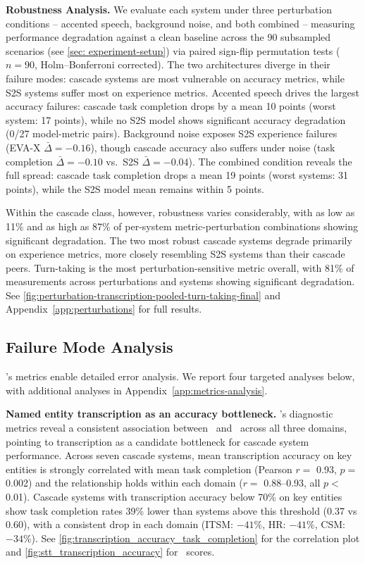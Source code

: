 \textbf{Robustness Analysis.}
We evaluate each system under three perturbation conditions -- accented speech, background noise, and both combined -- measuring performance degradation against a clean baseline across the 90 subsampled scenarios (see \autoref{sec: experiment-setup}) via paired sign-flip permutation tests ($n{=}90$, Holm--Bonferroni corrected). The two architectures diverge in their failure modes: cascade systems are most vulnerable on accuracy metrics, while S2S systems suffer most on experience metrics. Accented speech drives the largest accuracy failures: cascade task completion drops by a mean 10 points (worst system: 17 points), while no S2S model shows significant accuracy degradation (0/27 model-metric pairs). Background noise exposes S2S experience failures (EVA-X $\bar{\Delta}{=}{-}0.16$), though cascade accuracy also suffers under noise (task completion $\bar{\Delta}{=}{-}0.10$ vs.\ S2S $\bar{\Delta}{=}{-}0.04$). The combined condition reveals the full spread: cascade task completion drops a mean 19 points (worst systems: 31 points), while the S2S model mean remains within 5 points. 

Within the cascade class, however, robustness varies considerably, with as low as 11\% and as high as 87\% of per-system metric-perturbation combinations showing significant degradation. The two most robust cascade systems degrade primarily on experience metrics, more closely resembling S2S systems than their cascade peers. Turn-taking is the most perturbation-sensitive metric overall, with 81\% of measurements across perturbations and systems showing significant degradation. See \autoref{fig:perturbation-transcription-pooled-turn-taking-final} and Appendix~\ref{app:perturbations} for full results.

\subsection{Failure Mode Analysis}
\label{sec:failure-modes}
\framework's metrics enable detailed error analysis. We report four targeted analyses below, with additional analyses in Appendix~\ref{app:metrics-analysis}.



\textbf{Named entity transcription as an accuracy bottleneck.}
\framework's diagnostic metrics reveal a consistent association between \metrictranscription~and \metrictaskcompletion~across all three domains, pointing to transcription as a candidate bottleneck for cascade system performance. Across seven cascade systems, mean transcription accuracy on key entities is strongly correlated with mean task completion (Pearson $r =$ 0.93, $p =$ 0.002)  and the relationship holds within each domain ($r =$ 0.88–0.93, all $p <$ 0.01). Cascade systems with transcription accuracy below 70\% on key entities show task completion rates 39\% lower than systems above this threshold (0.37 vs 0.60), with a consistent drop in each domain (ITSM: $-41\%$, HR: $-41\%$, CSM: $-34\%$). See \autoref{fig:transcription_accuracy_task_completion} for the correlation plot and \autoref{fig:stt_transcription_accuracy} for \metrictranscription~scores.


